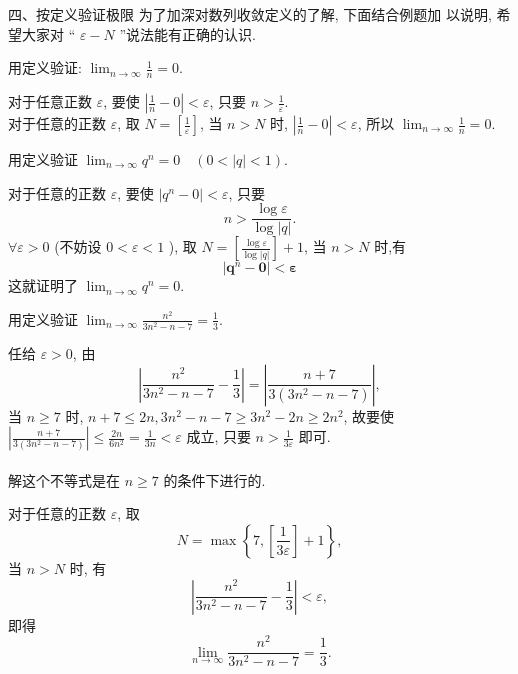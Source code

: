 \documentclass [t,12pt,mathserif] {beamer}
\begin{document}
\begin{frame}{ 四、按定义验证极限}%
为了加深对数列收敛定义的了解, 下面结合例题加 以说明, 希望大家对 “ $\varepsilon-N$ ”说法能有正确的认识. \\
\begin{ex}
用定义验证: $\lim _{n \rightarrow \infty} \frac{1}{n}=0$.
\end{ex}
 对于任意正数 $\varepsilon$, 要使 $\left|\frac{1}{n}-0\right|<\varepsilon$, 只要 $n>\frac{1}{\varepsilon}$.\\
\zheng 对于任意的正数 $\varepsilon$, 取 $N=\left[\frac{1}{\varepsilon}\right]$, 当 $n>N$ 时, $\left|\frac{1}{n}-0\right|<\varepsilon$, 所以 $\lim _{n \rightarrow \infty} \frac{1}{n}=0$.  
\end{frame}

\begin{frame}{}%
\begin{ex}
用定义验证 $\lim _{n \rightarrow \infty} q^n=0 \quad(0<|q|<1)$.
\end{ex} 
 对于任意的正数 $\varepsilon$, 要使 $\left|q^n-0\right|<\varepsilon$, 只要
$$
n>\frac{\log \varepsilon}{\log |q|} . 
$$
\zheng $\forall \varepsilon>0$ (不妨设 $0<\varepsilon<1$ ), 取 $N=\left[\frac{\log \varepsilon}{\log |q|}\right]+1$, 当 $n>N$ 时,有
$$
\left|\boldsymbol{q}^n-\mathbf{0}\right|<\boldsymbol{\varepsilon}
$$
这就证明了 $\lim _{n \rightarrow \infty} q^n=0$.
    
\end{frame}


\begin{frame}{}%
\begin{ex}
用定义验证 $\lim _{n \rightarrow \infty} \frac{n^2}{3 n^2-n-7}=\frac{1}{3}$.
\end{ex} 
 任给 $\varepsilon>0$, 由
$$
\left|\frac{n^2}{3 n^2-n-7}-\frac{1}{3}\right|=\left|\frac{n+7}{3\left(3 n^2-n-7\right)}\right|,
$$
当 $n \geq 7$ 时, $n+7 \leq 2 n, 3 n^2-n-7 \geq 3 n^2-2 n \geq 2 n^2$,
故要使 $\left|\frac{n+7}{3\left(3 n^2-n-7\right)}\right| \leq \frac{2 n}{6 n^2}=\frac{1}{3 n}<\varepsilon $ 成立, 只要 $n>\frac{1}{3 \varepsilon}$ 即可.  \\
~\\
 解这个不等式是在 $n \geq 7$ 的条件下进行的. 
\end{frame}


\begin{frame}{}%
\zheng 对于任意的正数 $\varepsilon$, 取
$$
N=\max \left\{7,\left[\frac{1}{3 \varepsilon}\right]+1\right\} , 
$$
当 $n>N$ 时, 有
$$
\left|\frac{n^2}{3 n^2-n-7}-\frac{1}{3}\right|<\varepsilon,
$$
即得
$$
\lim _{n \rightarrow \infty} \frac{n^2}{3 n^2-n-7}=\frac{1}{3} .
$$   
\end{frame}
\end{document}
